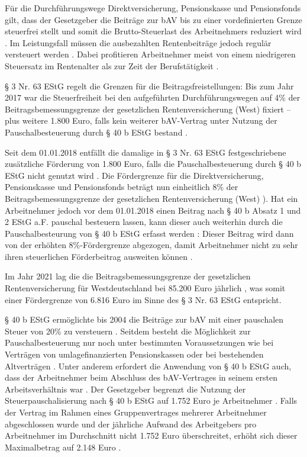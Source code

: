 \hspace{1cm}Für die Durchführungswege Direktversicherung, Pensionskasse und Pensionsfonds gilt, dass der Gesetzgeber die Beiträge zur bAV bis zu einer vordefinierten Grenze steuerfrei stellt und somit die Brutto-Steuerlast des Arbeitnehmers reduziert wird \cite[S. 109]{buttler2017einfuehrung}. Im Leistungsfall müssen die ausbezahlten Rentenbeiträge jedoch regulär versteuert werden \cite[S. 122]{buttler2017einfuehrung}. Dabei profitieren Arbeitnehmer meist von einem niedrigeren Steuersatz im Rentenalter als zur Zeit der Berufstätigkeit \cite{verbraucherzentrale}. 

§ 3 Nr. 63 EStG regelt die Grenzen für die Beitragsfreistellungen: Bis zum Jahr 2017 war die Steuerfreiheit bei den aufgeführten Durchführungswegen auf 4\% der Beitragsbemessungsgrenze der gesetzlichen Rentenversicherung (West) fixiert -- plus weitere 1.800 Euro, falls kein weiterer bAV-Vertrag unter Nutzung der Pauschalbesteuerung durch § 40 b EStG bestand \cite[S. 111]{buttler2017einfuehrung}. 

Seit dem 01.01.2018 entfällt die damalige in § 3 Nr. 63 EStG festgeschriebene zusätzliche Förderung von 1.800 Euro, falls die Pauschalbesteuerung durch § 40 b EStG nicht genutzt wird \cite[S. 111]{buttler2017einfuehrung}. Die Fördergrenze für die Direktversicherung, Pensionskasse und Pensionsfonds beträgt nun einheitlich 8\% der Beitragsbemessungsgrenze der gesetzlichen Rentenversicherung (West) \cite[S. 111]{buttler2017einfuehrung}). Hat ein Arbeitnehmer jedoch vor dem 01.01.2018 einen Beitrag nach § 40 b Absatz 1 und 2 EStG a.F. pauschal besteuern lassen, kann dieser auch weiterhin durch die Pauschalbesteurung von § 40 b EStG erfasst werden \cite[S. 114 f.]{buttler2017einfuehrung}: Dieser Beitrag wird dann von der erhöhten 8\%-Fördergrenze abgezogen, damit Arbeitnehmer nicht zu sehr ihren steuerlichen Förderbeitrag ausweiten können \cite[S. 111]{buttler2017einfuehrung}. 

Im Jahr 2021 lag die die Beitragsbemessungsgrenze der gesetzlichen Rentenversicherung für Westdeutschland bei 85.200 Euro jährlich \cite{bbg2021}, was somit einer Fördergrenze von 6.816 Euro im Sinne des § 3 Nr. 63 EStG entspricht.

§ 40 b EStG ermöglichte bis 2004 die Beiträge zur bAV mit einer pauschalen Steuer von 20\% zu versteuern \cite[S. 113]{buttler2017einfuehrung}. Seitdem besteht die Möglichkeit zur Pauschalbesteuerung nur noch unter bestimmten Voraussetzungen wie bei Verträgen von umlagefinanzierten Pensionskassen oder bei bestehenden Altverträgen \cite[S. 113]{buttler2017einfuehrung}. Unter anderem erfordert die Anwendung von § 40 b EStG auch, dass der Arbeitnehmer beim Abschluss des bAV-Vertrages in seinem ersten Arbeitsverhältnis war \cite[S. 116]{buttler2017einfuehrung}. Der Gesetzgeber begrenzt die Nutzung der Steuerpauschalisierung nach § 40 b EStG auf 1.752 Euro je Arbeitnehmer \cite[S. 116]{buttler2017einfuehrung}. Falls der Vertrag im Rahmen eines Gruppenvertrages mehrerer Arbeitnehmer abgeschlossen wurde und der jährliche Aufwand des Arbeitgebers pro Arbeitnehmer im Durchschnitt nicht 1.752 Euro überschreitet, erhöht sich dieser Maximalbetrag auf 2.148 Euro \cite[S. 117]{buttler2017einfuehrung}.


